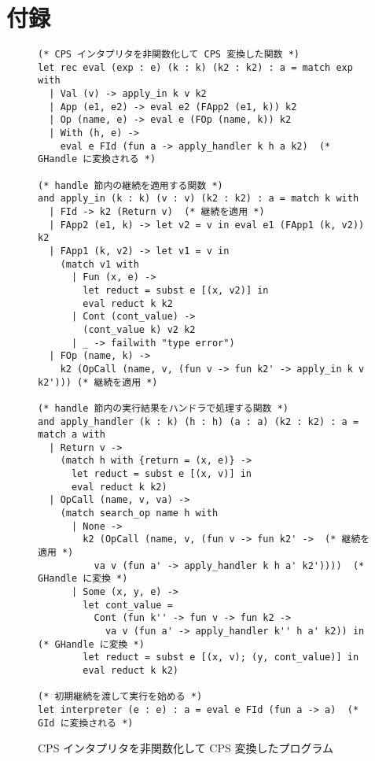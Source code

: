 \appendix
\section{付録}

\begin{figure}
\begin{verbatim}
(* CPS インタプリタを非関数化して CPS 変換した関数 *)
let rec eval (exp : e) (k : k) (k2 : k2) : a = match exp with
  | Val (v) -> apply_in k v k2
  | App (e1, e2) -> eval e2 (FApp2 (e1, k)) k2
  | Op (name, e) -> eval e (FOp (name, k)) k2
  | With (h, e) ->
    eval e FId (fun a -> apply_handler k h a k2)  (* GHandle に変換される *)

(* handle 節内の継続を適用する関数 *)
and apply_in (k : k) (v : v) (k2 : k2) : a = match k with
  | FId -> k2 (Return v)  (* 継続を適用 *)
  | FApp2 (e1, k) -> let v2 = v in eval e1 (FApp1 (k, v2)) k2
  | FApp1 (k, v2) -> let v1 = v in
    (match v1 with
      | Fun (x, e) ->
        let reduct = subst e [(x, v2)] in
        eval reduct k k2
      | Cont (cont_value) ->
        (cont_value k) v2 k2
      | _ -> failwith "type error")
  | FOp (name, k) ->
    k2 (OpCall (name, v, (fun v -> fun k2' -> apply_in k v k2'))) (* 継続を適用 *)

(* handle 節内の実行結果をハンドラで処理する関数 *)
and apply_handler (k : k) (h : h) (a : a) (k2 : k2) : a = match a with
  | Return v ->
    (match h with {return = (x, e)} ->
      let reduct = subst e [(x, v)] in
      eval reduct k k2)
  | OpCall (name, v, va) ->
    (match search_op name h with
      | None ->
        k2 (OpCall (name, v, (fun v -> fun k2' ->  (* 継続を適用 *)
          va v (fun a' -> apply_handler k h a' k2'))))  (* GHandle に変換 *)
      | Some (x, y, e) ->
        let cont_value =
          Cont (fun k'' -> fun v -> fun k2 ->
            va v (fun a' -> apply_handler k'' h a' k2)) in  (* GHandle に変換 *)
        let reduct = subst e [(x, v); (y, cont_value)] in
        eval reduct k k2)

(* 初期継続を渡して実行を始める *)
let interpreter (e : e) : a = eval e FId (fun a -> a)  (* GId に変換される *)
\end{verbatim}
\caption{CPS インタプリタを非関数化して CPS 変換したプログラム}
\label{figure:3cps}
\end{figure}

